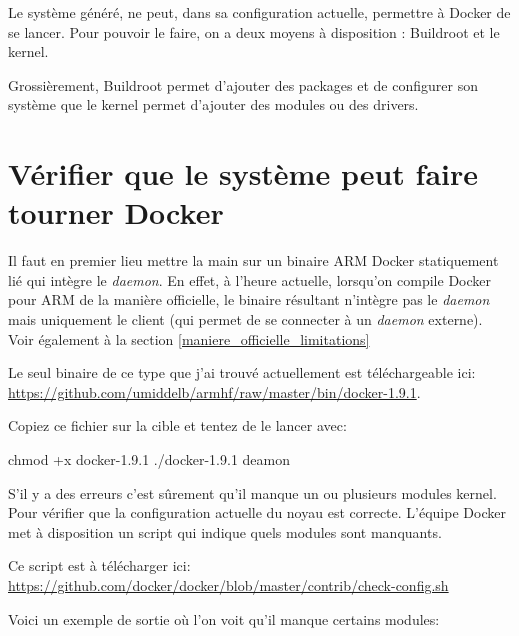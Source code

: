 \documentclass[11pt,a4paper,oneside]{report}
\begin{document}
Le système généré, ne peut, dans sa configuration actuelle, permettre à Docker de se lancer. Pour pouvoir le faire, on a deux moyens à disposition : Buildroot et le kernel.

Grossièrement, Buildroot permet d'ajouter des packages et de configurer son système      que le kernel permet d'ajouter des modules ou des drivers.

\section{Vérifier que le système peut faire tourner Docker}

Il faut en premier lieu mettre la main sur un binaire ARM Docker statiquement lié qui intègre le \emph{daemon}. En effet, à l'heure actuelle, lorsqu'on compile Docker pour ARM de la manière officielle, le binaire résultant n'intègre pas le \emph{daemon} mais uniquement le client (qui permet de se connecter à un \emph{daemon} externe). Voir également à la section \ref{maniere_officielle_limitations}

Le seul binaire de ce type que j'ai trouvé actuellement est téléchargeable ici: \url{https://github.com/umiddelb/armhf/raw/master/bin/docker-1.9.1}\label{binaire_arm}.

Copiez ce fichier sur la cible et tentez de le lancer avec:

\begin{bashcode}
chmod +x docker-1.9.1
./docker-1.9.1 deamon
\end{bashcode}

S'il y a des erreurs c'est sûrement qu'il manque un ou plusieurs modules kernel. Pour vérifier que la configuration actuelle du noyau est correcte. L'équipe Docker met à disposition un script qui indique quels modules sont manquants.

Ce script est à télécharger ici: \url{https://github.com/docker/docker/blob/master/contrib/check-config.sh}

\newpage
Voici un exemple de sortie où l'on voit qu'il manque certains modules:
\end{document}
